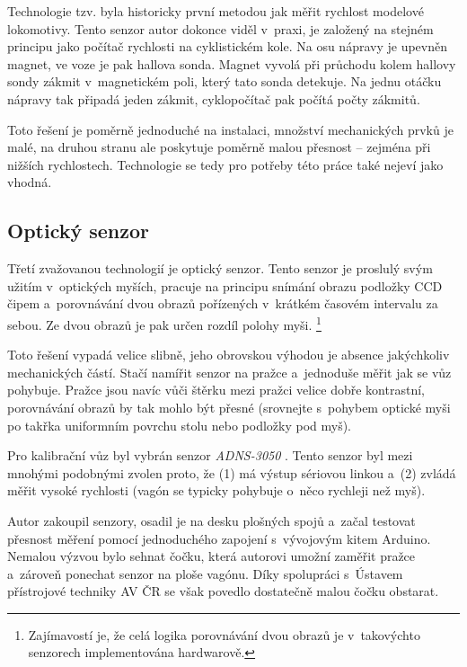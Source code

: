 Technologie tzv.  byla historicky první metodou jak měřit
rychlost modelové lokomotivy. Tento senzor autor dokonce viděl v~praxi, je
založený na stejném principu jako počítač rychlosti na cyklistickém kole.  Na
osu nápravy je upevněn magnet, ve voze je pak hallova sonda. Magnet vyvolá při
průchodu kolem hallovy sondy zákmit v~magnetickém poli, který tato sonda
detekuje. Na jednu otáčku nápravy tak připadá jeden zákmit, cyklopočítač pak
počítá počty zákmitů.

Toto řešení je poměrně jednoduché na instalaci, množství mechanických prvků je
malé, na druhou stranu ale poskytuje poměrně malou přesnost -- zejména při
nižších rychlostech. Technologie  se tedy pro potřeby této
práce také nejeví jako vhodná.

\subsection{Optický senzor}
\label{subsec:wsm-senzor-opto}

Třetí zvažovanou technologií je optický senzor. Tento senzor je proslulý svým
užitím v~optických myších, pracuje na principu snímání obrazu podložky CCD
čipem a~porovnávání dvou obrazů pořízených v~krátkém časovém intervalu za
sebou. Ze dvou obrazů je pak určen rozdíl polohy myši. \footnote{Zajímavostí
je, že celá logika porovnávání dvou obrazů je v~takovýchto senzorech
implementována hardwarově.}

Toto řešení vypadá velice slibně, jeho obrovskou výhodou je absence jakýchkoliv
mechanických částí. Stačí namířit senzor na pražce a~jednoduše měřit jak se vůz
pohybuje. Pražce jsou navíc vůči štěrku mezi pražci velice dobře kontrastní,
porovnávání obrazů by tak mohlo být přesné (srovnejte s~pohybem optické
myši po takřka uniformním povrchu stolu nebo podložky pod myš).

Pro kalibrační vůz byl vybrán senzor \textit{ADNS-3050} \cite{adns-3050}.
Tento senzor byl mezi mnohými podobnými zvolen proto, že (1) má výstup sériovou
linkou a~(2) zvládá měřit vysoké rychlosti (vagón se typicky pohybuje o~něco
rychleji než myš).

Autor zakoupil senzory, osadil je na desku plošných spojů a~začal testovat
přesnost měření pomocí jednoduchého zapojení s~vývojovým kitem Arduino. Nemalou
výzvou bylo sehnat čočku, která autorovi umožní zaměřit pražce a~zároveň
ponechat senzor na ploše vagónu. Díky spolupráci s~Ústavem přístrojové techniky
AV ČR se však povedlo dostatečně malou čočku obstarat.

